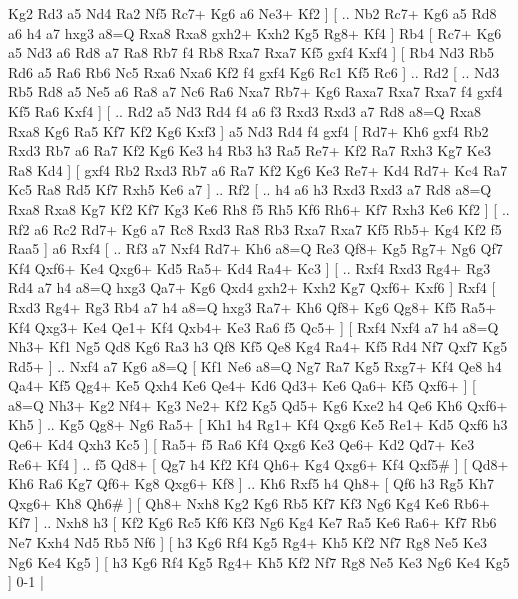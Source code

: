  Kg2 Rd3  a5 Nd4  Ra2 Nf5  Rc7+ Kg6  a6 Ne3+  Kf2   ]  [ .. Nb2  Rc7+ Kg6  a5 Rd8  a6 h4  a7 hxg3  a8=Q Rxa8  Rxa8 gxh2+  Kxh2 Kg5  Rg8+ Kf4   ]  Rb4 [  Rc7+ Kg6  a5 Nd3  a6 Rd8  a7 Ra8  Rb7 f4  Rb8 Rxa7  Rxa7 Kf5  gxf4 Kxf4   ]  [  Rb4 Nd3  Rb5 Rd6  a5 Ra6  Rb6 Nc5  Rxa6 Nxa6  Kf2 f4  gxf4 Kg6  Rc1 Kf5  Rc6   ] .. Rd2 [ .. Nd3  Rb5 Rd8  a5 Ne5  a6 Ra8  a7 Nc6  Ra6 Nxa7  Rb7+ Kg6  Raxa7 Rxa7  Rxa7 f4  gxf4 Kf5  Ra6 Kxf4   ]  [ .. Rd2  a5 Nd3  Rd4 f4  a6 f3  Rxd3 Rxd3  a7 Rd8  a8=Q Rxa8  Rxa8 Kg6  Ra5 Kf7  Kf2 Kg6  Kxf3   ]  a5   Nd3    Rd4   f4    gxf4 [  Rd7+ Kh6  gxf4 Rb2  Rxd3 Rb7  a6 Ra7  Kf2 Kg6  Ke3 h4  Rb3 h3  Ra5 Re7+  Kf2 Ra7  Rxh3 Kg7  Ke3 Ra8  Kd4   ]  [  gxf4 Rb2  Rxd3 Rb7  a6 Ra7  Kf2 Kg6  Ke3 Re7+  Kd4 Rd7+  Kc4 Ra7  Kc5 Ra8  Rd5 Kf7  Rxh5 Ke6  a7   ] .. Rf2 [ .. h4  a6 h3  Rxd3 Rxd3  a7 Rd8  a8=Q Rxa8  Rxa8 Kg7  Kf2 Kf7  Kg3 Ke6  Rh8 f5  Rh5 Kf6  Rh6+ Kf7  Rxh3 Ke6  Kf2   ]  [ .. Rf2  a6 Rc2  Rd7+ Kg6  a7 Rc8  Rxd3 Ra8  Rb3 Rxa7  Rxa7 Kf5  Rb5+ Kg4  Kf2 f5  Raa5   ]  a6   Rxf4 [ .. Rf3  a7 Nxf4  Rd7+ Kh6  a8=Q Re3  Qf8+ Kg5  Rg7+ Ng6  Qf7 Kf4  Qxf6+ Ke4  Qxg6+ Kd5  Ra5+ Kd4  Ra4+ Kc3   ]  [ .. Rxf4  Rxd3 Rg4+  Rg3 Rd4  a7 h4  a8=Q hxg3  Qa7+ Kg6  Qxd4 gxh2+  Kxh2 Kg7  Qxf6+ Kxf6   ]  Rxf4 [  Rxd3 Rg4+  Rg3 Rb4  a7 h4  a8=Q hxg3  Ra7+ Kh6  Qf8+ Kg6  Qg8+ Kf5  Ra5+ Kf4  Qxg3+ Ke4  Qe1+ Kf4  Qxb4+ Ke3  Ra6 f5  Qc5+   ]  [  Rxf4 Nxf4  a7 h4  a8=Q Nh3+  Kf1 Ng5  Qd8 Kg6  Ra3 h3  Qf8 Kf5  Qe8 Kg4  Ra4+ Kf5  Rd4 Nf7  Qxf7 Kg5  Rd5+   ] .. Nxf4    a7   Kg6    a8=Q [  Kf1 Ne6  a8=Q Ng7  Ra7 Kg5  Rxg7+ Kf4  Qe8 h4  Qa4+ Kf5  Qg4+ Ke5  Qxh4 Ke6  Qe4+ Kd6  Qd3+ Ke6  Qa6+ Kf5  Qxf6+   ]  [  a8=Q Nh3+  Kg2 Nf4+  Kg3 Ne2+  Kf2 Kg5  Qd5+ Kg6  Kxe2 h4  Qe6 Kh6  Qxf6+ Kh5   ] .. Kg5    Qg8+   Ng6    Ra5+ [  Kh1 h4  Rg1+ Kf4  Qxg6 Ke5  Re1+ Kd5  Qxf6 h3  Qe6+ Kd4  Qxh3 Kc5   ]  [  Ra5+ f5  Ra6 Kf4  Qxg6 Ke3  Qe6+ Kd2  Qd7+ Ke3  Re6+ Kf4   ] .. f5    Qd8+    [  Qg7 h4  Kf2 Kf4  Qh6+ Kg4  Qxg6+ Kf4  Qxf5#   ]  [  Qd8+ Kh6  Ra6 Kg7  Qf6+ Kg8  Qxg6+ Kf8   ] .. Kh6    Rxf5   h4    Qh8+    [  Qf6 h3  Rg5 Kh7  Qxg6+ Kh8  Qh6#   ]  [  Qh8+ Nxh8  Kg2 Kg6  Rb5 Kf7  Kf3 Ng6  Kg4 Ke6  Rb6+ Kf7   ] .. Nxh8   h3 [  Kf2 Kg6  Rc5 Kf6  Kf3 Ng6  Kg4 Ke7  Ra5 Ke6  Ra6+ Kf7  Rb6 Ne7  Kxh4 Nd5  Rb5 Nf6   ]  [  h3 Kg6  Rf4 Kg5  Rg4+ Kh5  Kf2 Nf7  Rg8 Ne5  Ke3 Ng6  Ke4 Kg5   ]  [  h3 Kg6  Rf4 Kg5  Rg4+ Kh5  Kf2 Nf7  Rg8 Ne5  Ke3 Ng6  Ke4 Kg5   ] 0-1  |
